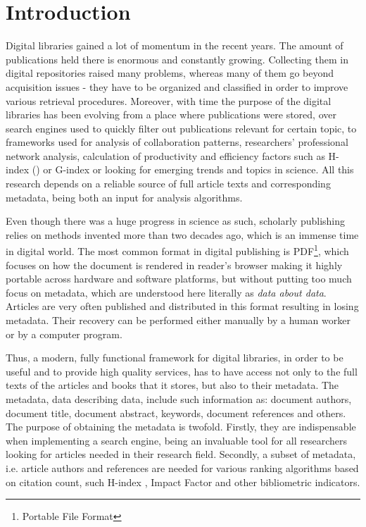 \chapter{Introduction}
Digital libraries gained a lot of momentum in the recent years. The amount of publications held there is enormous and constantly growing. Collecting them in digital repositories raised many problems, whereas many of them go beyond acquisition issues - they have to be organized and classified in order to improve various retrieval procedures. Moreover, with time the purpose of the digital libraries has been evolving from a place where publications were stored, over search engines used to quickly filter out publications relevant for certain topic, to frameworks used for analysis of collaboration patterns, researchers' professional network analysis, calculation of productivity and efficiency factors such as H-index (\cite{Hirsch}) or G-index or looking for emerging trends and topics in science.
All this research depends on a reliable source of full article texts and corresponding metadata, being both an input for analysis algorithms.

Even though there was a huge progress in science as such, scholarly publishing relies on methods invented more than two decades ago, which is an immense time in digital world. The most common format in digital publishing is PDF\footnote{Portable File Format}, which focuses on how the document is rendered in reader's browser making it highly portable across hardware and software platforms, but without putting too much focus on metadata, which are understood here literally as \textit{data about data}. Articles are very often published and distributed in this format resulting in losing metadata. Their recovery can be performed either manually by a human worker or by a computer program. 

Thus, a modern, fully functional framework for digital libraries, in order to be useful and to provide high quality services, has to have access not only to the full texts of the articles and books that it stores, but also to their metadata. The metadata, data describing data, include such information as: document authors, document title, document abstract, keywords, document references and others. The purpose of obtaining the metadata is twofold. Firstly, they are indispensable when implementing a search engine, being an invaluable tool for all researchers looking for articles needed in their research field. Secondly, a subset of metadata, i.e. article authors and references are needed for various ranking algorithms based on citation count, such H-index \cite{Hirsch}, Impact Factor and other bibliometric indicators.

